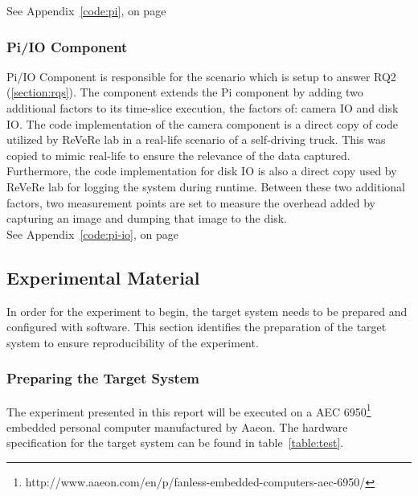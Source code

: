 See Appendix~\ref{code:pi}, on page ~\pageref{code:pi}

\subsubsection{Pi/IO Component}

Pi/IO Component is responsible for the scenario which is setup to answer RQ2 (\ref{section:rqs}). The component extends the Pi component by adding two additional factors to its time-slice execution, the factors of: camera IO and disk IO. The code implementation of the camera component is a direct copy of code utilized by ReVeRe lab in a real-life scenario of a self-driving truck. This was copied to mimic real-life to ensure the relevance of the data captured. Furthermore, the code implementation for disk IO is also a direct copy used by ReVeRe lab for logging the system during runtime. Between these two additional factors, two measurement points are set to measure the overhead added by capturing an image and dumping that image to the disk.\\

See Appendix~\ref{code:pi-io}, on page ~\pageref{code:pi-io}


\subsection{Experimental Material}
In order for the experiment to begin, the target system needs to be prepared and configured with software. This section identifies the preparation of the target system to ensure reproducibility of the experiment.

\subsubsection{Preparing the Target System}
The experiment presented in this report will be executed on a AEC 6950\footnote{http://www.aaeon.com/en/p/fanless-embedded-computers-aec-6950/} embedded personal computer manufactured by Aaeon.   The hardware specification for the target system can be found in table~\ref{table:test}. 

